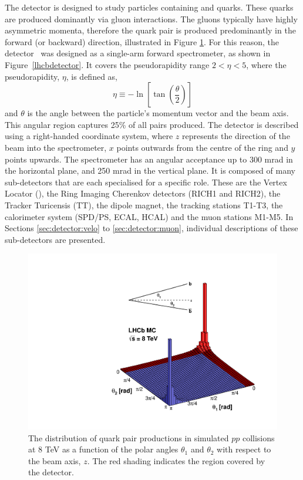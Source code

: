 The \lhcb detector is designed to study particles containing \bquark and \cquark quarks. These quarks are produced dominantly via gluon interactions. The gluons typically have highly asymmetric momenta, therefore the \bquark\bquarkbar quark pair is produced predominantly in the forward (or backward) direction, illustrated in Figure \ref{bbar}. For this reason, the \lhcb detector~\cite{Alves:2008zz,LHCb-DP-2014-002} was designed as a single-arm forward spectrometer, as shown in Figure~\ref{lhcbdetector}. It covers the \mbox{pseudorapidity} range $2<\eta <5$, where the pseudorapidity, $\eta$, is defined as,
\begin{equation}
\eta \equiv -\ln \left[ \tan \left( \frac{\theta}{2} \right) \right]
\end{equation}
and $\theta$ is the angle between the particle's momentum vector and the beam axis. This angular region captures 25\% of all \bquark\bquarkbar pairs produced. The detector is described using a right-handed coordinate system, where $z$ represents the direction of the beam into the spectrometer, $x$ points outwards from the centre of the ring and $y$ points upwards. The \lhcb spectrometer has an angular acceptance up to 300 mrad in the horizontal plane, and 250 mrad in the vertical plane. It is composed of many sub-detectors that are each specialised for a specific role. These are the Vertex Locator (\velo), the Ring Imaging Cherenkov detectors (RICH1 and RICH2), the Tracker Turicensis (TT), the dipole magnet, the tracking stations T1-T3, the calorimeter system (SPD/PS, ECAL, HCAL) and the muon stations M1-M5. In Sections \ref{sec:detector:velo} to \ref{sec:detector:muon}, individual descriptions of these sub-detectors are presented.

\begin{figure}
\centering
\includegraphics[width=0.5\linewidth]{figures/detector/08_rad_acc_scheme_right.pdf}
\caption{The distribution of \bquark\bquarkbar quark pair productions in simulated $pp$ collisions at 8 TeV as a function of the polar angles $\theta_1$ and $\theta_2$ with respect to the beam axis, $z$. The red shading indicates the region covered by the \lhcb detector.}
\label{bbar}
\end{figure}

